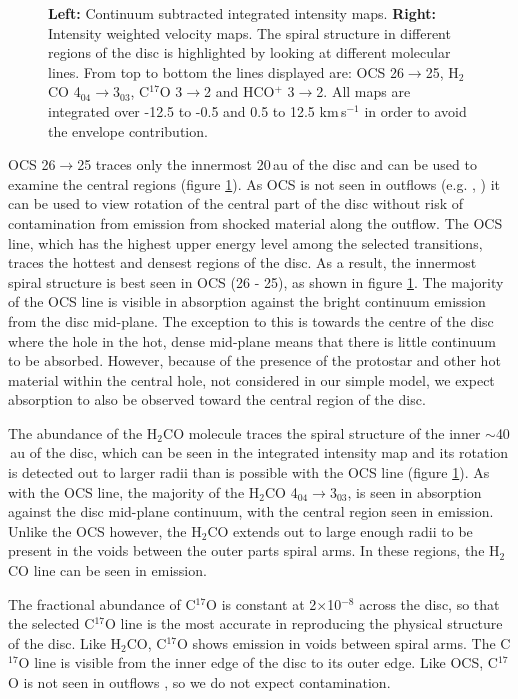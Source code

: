 \documentclass[useAMS,usenatbib]{mn2e}
\begin{document}
\begin{figure}
 \caption{{\bf Left:} Continuum subtracted integrated intensity maps. {\bf Right:} Intensity weighted velocity maps. The spiral structure in different regions of the disc is highlighted by looking at different molecular lines. From top to bottom the lines displayed are: OCS 26$\rightarrow$25, H$_2$CO 4$_{04}$$\rightarrow$3$_{03}$, C$^{17}$O 3$\rightarrow$2 and HCO$^+$ 3$\rightarrow$2. All maps are integrated over -12.5 to -0.5 and 0.5 to 12.5 km$\,$s$^{-1}$ in order to avoid the envelope contribution.}
 \label{sim_all}
\end{figure}


OCS 26$\rightarrow$25 traces only the innermost 20$\,$au of the disc and can be used to examine the central regions (figure \ref{sim_all}). As OCS is not seen in outflows (e.g. \citealt{Stanke2007}, \citealt{VDTak2003}) it can be used to view rotation of the central part of the disc without risk of contamination from emission from shocked material along the outflow. The OCS line, which has the highest upper energy level among the selected transitions, traces the hottest and densest regions of the disc. As a result, the innermost spiral structure is best seen in OCS (26 - 25), as shown in figure \ref{sim_all}. The majority of the OCS line is visible in absorption against the bright continuum emission from the disc mid-plane. The exception to this is towards the centre of the disc where the hole in the hot, dense mid-plane means that there is little continuum to be absorbed. However, because of the presence of the protostar and other hot material within the central hole, not considered in our simple model, we expect absorption to also be observed toward the central region of the disc.\smallskip

The abundance of the H$_2$CO molecule traces the spiral structure of the inner $\sim$40$\,$au of the disc, which can be seen in the integrated intensity map and its rotation is detected out to larger radii than is possible with the OCS line (figure \ref{sim_all}). As with the OCS line, the majority of the H$_2$CO 4$_{04}\rightarrow$3$_{03}$, is seen in absorption against the disc mid-plane continuum, with the central region seen in emission. Unlike the OCS however, the H$_2$CO extends out to large enough radii to be present in the voids between the outer parts spiral arms. In these regions, the H$_2$CO line can be seen in emission.\smallskip

The fractional abundance of C$^{17}$O is constant at 2$\times$10$^{-8}$ across the disc, so that the selected C$^{17}$O line is the most accurate in reproducing the physical structure of the disc. Like H$_2$CO, C$^{17}$O shows emission in voids between spiral arms. The C$^{17}$O line is visible from the inner edge of the disc to its outer edge. Like OCS, C$^{17}$O is not seen in outflows \citep{Yildiz2012}, so we do not expect contamination.\smallskip
\end{document}
